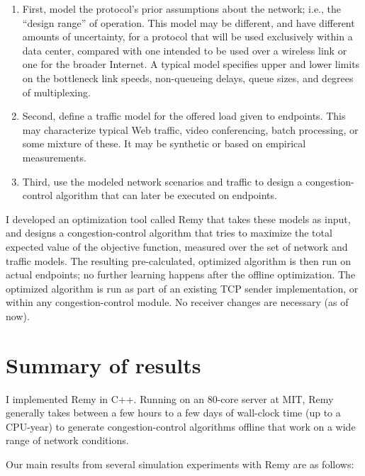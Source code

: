 \begin{enumerate}

\item First, model the protocol's prior assumptions about the network;
  i.e., the ``design range'' of operation. This model
  may be different, and have different amounts of uncertainty, for a
  protocol that will be used exclusively within a data center,
  compared with one intended to be used over a wireless link or one
  for the broader Internet. A typical model specifies upper and lower
  limits on the bottleneck link speeds, non-queueing delays, queue
  sizes, and degrees of multiplexing.

\item Second, define a traffic model for the offered load given to
  endpoints. This may characterize typical Web traffic, video
  conferencing, batch processing, or some mixture of these. It may
  be synthetic or based on empirical measurements.

\item Third, use the modeled network scenarios and traffic to design a
  congestion-control algorithm that can later be executed on endpoints.

\end{enumerate}

I developed an optimization tool called Remy that takes these models
as input, and designs a congestion-control algorithm that tries to
maximize the total expected value of the objective function, measured
over the set of network and traffic models. The resulting
pre-calculated, optimized algorithm is then run on actual endpoints;
no further learning happens after the offline optimization. The
optimized algorithm is run as part of an existing TCP sender
implementation, or within any congestion-control module. No receiver
changes are necessary (as of now).

\section{Summary of results}

I implemented Remy in C++. Running on an 80-core server at MIT, Remy
generally takes between a few hours to a few days of wall-clock time
(up to a CPU-year) to generate congestion-control algorithms offline
that work on a wide range of network conditions.

Our main results from several simulation experiments
with Remy are as follows:


